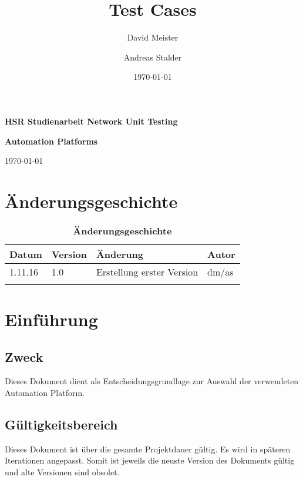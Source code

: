 \documentclass[a4,12pt]{scrartcl}
\title{Test Cases}
\author{David Meister \and Andreas Stalder}
\date{\today}
\begin{document}
\begin{titlepage}
	\centering
	\vspace{5cm}
	\begin{center}
	\end{center}
	\vspace{8cm}
	\raggedright
	{\bfseries HSR Studienarbeit Network Unit Testing\par}
	{\huge\bfseries Automation Platforms \par}
	\vspace{1cm}
	{\theauthor \par}
	{\today\par}

\end{titlepage}

\section{Änderungsgeschichte}

\begin{table}[htb]
\centering
    \begin{tabular}{@{} l l l l@{}}\toprule    
    {Datum} & {Version} & {Änderung} & {Autor}\\ \midrule
    1.11.16 & 1.0 & Erstellung erster Version & dm/as\\ \addlinespace
    \end{tabular}
\caption{\textbf{Änderungsgeschichte}}
\end{table}

\newpage

\tableofcontents
\newpage


\section{Einführung}
\subsection{Zweck}
Dieses Dokument dient als Entscheidungsgrundlage zur Auswahl der verwendeten Automation Platform.
\subsection{Gültigkeitsbereich}
Dieses Dokument ist über die gesamte Projektdauer gültig. Es wird in späteren Iterationen angepasst. Somit ist jeweils die neuste Version des Dokuments gültig und alte Versionen sind obsolet.
\end{document}

